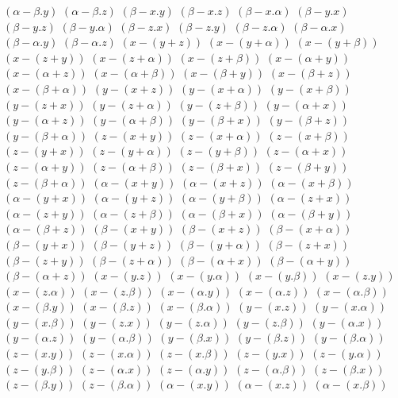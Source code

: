 $ (\alpha - \beta . y) $
$ (\alpha - \beta . z) $
$ (\beta - x . y) $
$ (\beta - x . z) $
$ (\beta - x . \alpha) $
$ (\beta - y . x) $
$ (\beta - y . z) $
$ (\beta - y . \alpha) $
$ (\beta - z . x) $
$ (\beta - z . y) $
$ (\beta - z . \alpha) $
$ (\beta - \alpha . x) $
$ (\beta - \alpha . y) $
$ (\beta - \alpha . z) $
$ (x - (y + z)) $
$ (x - (y + \alpha)) $
$ (x - (y + \beta)) $
$ (x - (z + y)) $
$ (x - (z + \alpha)) $
$ (x - (z + \beta)) $
$ (x - (\alpha + y)) $
$ (x - (\alpha + z)) $
$ (x - (\alpha + \beta)) $
$ (x - (\beta + y)) $
$ (x - (\beta + z)) $
$ (x - (\beta + \alpha)) $
$ (y - (x + z)) $
$ (y - (x + \alpha)) $
$ (y - (x + \beta)) $
$ (y - (z + x)) $
$ (y - (z + \alpha)) $
$ (y - (z + \beta)) $
$ (y - (\alpha + x)) $
$ (y - (\alpha + z)) $
$ (y - (\alpha + \beta)) $
$ (y - (\beta + x)) $
$ (y - (\beta + z)) $
$ (y - (\beta + \alpha)) $
$ (z - (x + y)) $
$ (z - (x + \alpha)) $
$ (z - (x + \beta)) $
$ (z - (y + x)) $
$ (z - (y + \alpha)) $
$ (z - (y + \beta)) $
$ (z - (\alpha + x)) $
$ (z - (\alpha + y)) $
$ (z - (\alpha + \beta)) $
$ (z - (\beta + x)) $
$ (z - (\beta + y)) $
$ (z - (\beta + \alpha)) $
$ (\alpha - (x + y)) $
$ (\alpha - (x + z)) $
$ (\alpha - (x + \beta)) $
$ (\alpha - (y + x)) $
$ (\alpha - (y + z)) $
$ (\alpha - (y + \beta)) $
$ (\alpha - (z + x)) $
$ (\alpha - (z + y)) $
$ (\alpha - (z + \beta)) $
$ (\alpha - (\beta + x)) $
$ (\alpha - (\beta + y)) $
$ (\alpha - (\beta + z)) $
$ (\beta - (x + y)) $
$ (\beta - (x + z)) $
$ (\beta - (x + \alpha)) $
$ (\beta - (y + x)) $
$ (\beta - (y + z)) $
$ (\beta - (y + \alpha)) $
$ (\beta - (z + x)) $
$ (\beta - (z + y)) $
$ (\beta - (z + \alpha)) $
$ (\beta - (\alpha + x)) $
$ (\beta - (\alpha + y)) $
$ (\beta - (\alpha + z)) $
$ (x - (y . z)) $
$ (x - (y . \alpha)) $
$ (x - (y . \beta)) $
$ (x - (z . y)) $
$ (x - (z . \alpha)) $
$ (x - (z . \beta)) $
$ (x - (\alpha . y)) $
$ (x - (\alpha . z)) $
$ (x - (\alpha . \beta)) $
$ (x - (\beta . y)) $
$ (x - (\beta . z)) $
$ (x - (\beta . \alpha)) $
$ (y - (x . z)) $
$ (y - (x . \alpha)) $
$ (y - (x . \beta)) $
$ (y - (z . x)) $
$ (y - (z . \alpha)) $
$ (y - (z . \beta)) $
$ (y - (\alpha . x)) $
$ (y - (\alpha . z)) $
$ (y - (\alpha . \beta)) $
$ (y - (\beta . x)) $
$ (y - (\beta . z)) $
$ (y - (\beta . \alpha)) $
$ (z - (x . y)) $
$ (z - (x . \alpha)) $
$ (z - (x . \beta)) $
$ (z - (y . x)) $
$ (z - (y . \alpha)) $
$ (z - (y . \beta)) $
$ (z - (\alpha . x)) $
$ (z - (\alpha . y)) $
$ (z - (\alpha . \beta)) $
$ (z - (\beta . x)) $
$ (z - (\beta . y)) $
$ (z - (\beta . \alpha)) $
$ (\alpha - (x . y)) $
$ (\alpha - (x . z)) $
$ (\alpha - (x . \beta)) $
